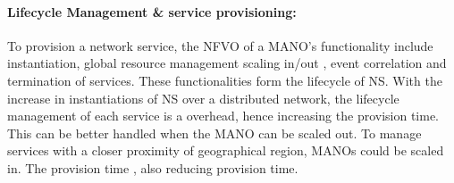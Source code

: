 \paragraph{Lifecycle Management \& service provisioning:} To provision a network service, the NFVO of a MANO's functionality include instantiation, global resource management scaling in/out , event correlation and termination of services. These functionalities form the lifecycle of NS. With the increase in instantiations of NS over a distributed network, the lifecycle management of each service is a overhead, hence increasing the provision time. This can be better handled when the MANO can be scaled out. To manage services with a closer proximity of geographical region, MANOs could be scaled in. The provision time , also reducing provision time.



